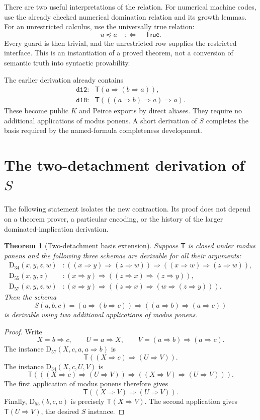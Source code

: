 \documentclass[11pt,letterpaper]{article}
\newtheorem{theorem}{Theorem}[section]
\newcommand{\Prov}[1]{\mathsf{T}(#1)}
\newcommand{\Imp}{\mathbin{\Rightarrow}}
\begin{document}
There are two useful interpretations of the relation. For numerical machine
codes, use the already checked numerical domination relation and its growth
lemmas. For an unrestricted calculus, use the universally true relation:
\[
u\preceq a\quad:\!\Longleftrightarrow\quad\mathsf{True}.
\]
Every guard is then trivial, and the unrestricted row supplies the restricted
interface. This is an instantiation of a proved theorem, not a conversion of
semantic truth into syntactic provability.

The earlier derivation already contains
\[
\begin{array}{ll}
\texttt{d12}: & \Prov{a\Imp(b\Imp a)},\\
\texttt{d18}: & \Prov{((a\Imp b)\Imp a)\Imp a}.
\end{array}
\]
These become public $K$ and Peirce exports by direct aliases. They require no
additional applications of modus ponens. A short derivation of $S$ completes
the basis required by the named-formula completeness development.

\section{The two-detachment derivation of \texorpdfstring{$S$}{S}}
\label{sec:two}

The following statement isolates the new contraction. Its proof does not
depend on a theorem prover, a particular encoding, or the history of the
larger dominated-implication derivation.

\begin{theorem}[Two-detachment basis extension]\label{thm:two}
Suppose $\mathsf{T}$ is closed under modus ponens and the following three
schemas are derivable for all their arguments:
\begin{align*}
\mathrm{D}_{34}(x,y,z,w)&:
  ((x\Imp y)\Imp(z\Imp w))\Imp((x\Imp w)\Imp(z\Imp w)),\\
\mathrm{D}_{55}(x,y,z)&:
  (x\Imp y)\Imp((z\Imp x)\Imp(z\Imp y)),\\
\mathrm{D}_{57}(x,y,z,w)&:
  (x\Imp y)\Imp((z\Imp x)\Imp(w\Imp(z\Imp y))).
\end{align*}
Then the schema
\[
S(a,b,c)=(a\Imp(b\Imp c))\Imp((a\Imp b)\Imp(a\Imp c))
\]
is derivable using two additional applications of modus ponens.
\end{theorem}

\begin{proof}
Write
\[
X=b\Imp c,\qquad U=a\Imp X,\qquad
V=(a\Imp b)\Imp(a\Imp c).
\]
The instance $\mathrm{D}_{57}(X,c,a,a\Imp b)$ is
\[
\Prov{(X\Imp c)\Imp(U\Imp V)}.
\]
The instance $\mathrm{D}_{34}(X,c,U,V)$ is
\[
\Prov{((X\Imp c)\Imp(U\Imp V))\Imp((X\Imp V)\Imp(U\Imp V))}.
\]
The first application of modus ponens therefore gives
\[
\Prov{(X\Imp V)\Imp(U\Imp V)}.
\]
Finally, $\mathrm{D}_{55}(b,c,a)$ is precisely $\Prov{X\Imp V}$.
The second application gives $\Prov{U\Imp V}$, the desired $S$ instance.
\end{proof}
\end{document}
